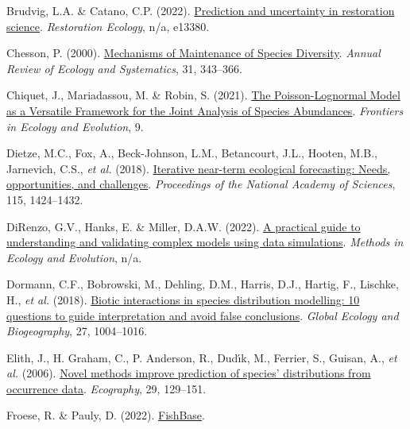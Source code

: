 \documentclass[9pt,biorxiv,doublespacing,lineno]{lapreprint}
\newlength{\cslhangindent}
\newlength{\cslentryspacingunit} %
\newenvironment{CSLReferences}[2] %
 {%
  \setlength{\parindent}{0pt}
  \ifodd #1
  \let\oldpar\par
  \def\par{\hangindent=\cslhangindent\oldpar}
  \fi
  \setlength{\parskip}{#2\cslentryspacingunit}
 }%
 {}
\begin{document}
\begin{CSLReferences}{1}{0}
\leavevmode{}%
Brudvig, L.A. \& Catano, C.P. (2022).
\href{https://doi.org/10.1111/rec.13380}{Prediction and uncertainty in
restoration science}. \emph{Restoration Ecology}, n/a, e13380.

\leavevmode{}%
Chesson, P. (2000).
\href{https://doi.org/10.1146/annurev.ecolsys.31.1.343}{Mechanisms of
Maintenance of Species Diversity}. \emph{Annual Review of Ecology and
Systematics}, 31, 343--366.

\leavevmode{}%
Chiquet, J., Mariadassou, M. \& Robin, S. (2021).
\href{https://doi.org/10.3389/fevo.2021.588292}{The Poisson-Lognormal
Model as a Versatile Framework for the Joint Analysis of Species
Abundances}. \emph{Frontiers in Ecology and Evolution}, 9.

\leavevmode{}%
Dietze, M.C., Fox, A., Beck-Johnson, L.M., Betancourt, J.L., Hooten,
M.B., Jarnevich, C.S., \emph{et al.} (2018).
\href{https://doi.org/10.1073/pnas.1710231115}{Iterative near-term
ecological forecasting: Needs, opportunities, and challenges}.
\emph{Proceedings of the National Academy of Sciences}, 115, 1424--1432.

\leavevmode{}%
DiRenzo, G.V., Hanks, E. \& Miller, D.A.W. (2022).
\href{https://doi.org/10.1111/2041-210X.14030}{A practical guide to
understanding and validating complex models using data simulations}.
\emph{Methods in Ecology and Evolution}, n/a.

\leavevmode{}%
Dormann, C.F., Bobrowski, M., Dehling, D.M., Harris, D.J., Hartig, F.,
Lischke, H., \emph{et al.} (2018).
\href{https://doi.org/10.1111/geb.12759}{Biotic interactions in species
distribution modelling: 10 questions to guide interpretation and avoid
false conclusions}. \emph{Global Ecology and Biogeography}, 27,
1004--1016.

\leavevmode{}%
Elith, J., H. Graham, C., P. Anderson, R., Dudı́k, M., Ferrier, S.,
Guisan, A., \emph{et al.} (2006).
\href{https://doi.org/10.1111/j.2006.0906-7590.04596.x}{Novel methods
improve prediction of species' distributions from occurrence data}.
\emph{Ecography}, 29, 129--151.

\leavevmode{}%
Froese, R. \& Pauly, D. (2022).
\href{https://www.fishbase.org}{FishBase}.


\end{CSLReferences}
\end{document}
